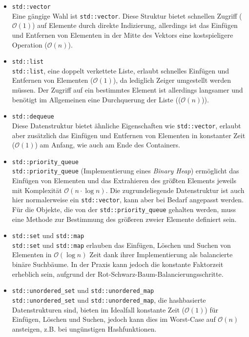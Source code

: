 \begin{itemize}
    \item \texttt{std::vector}\\
    Eine gängige Wahl ist \texttt{std::vector}.
    Diese Struktur bietet schnellen Zugriff ($\mathcal{O}(1)$) auf Elemente durch direkte Indizierung, allerdings ist
    das Einfügen und Entfernen von Elementen in der Mitte des Vektors eine kostspieligere Operation ($\mathcal{O}(n)$).
    \item \texttt{std::list}\\
    \texttt{std::list}, eine doppelt verkettete Liste, erlaubt schnelles Einfügen und Entfernen von Elementen ($\mathcal{O}(1)$),
    da lediglich Zeiger umgestellt werden müssen.
    Der Zugriff auf ein bestimmtes Element ist allerdings langsamer und benötigt im Allgemeinen eine Durchquerung der Liste (($\mathcal{O}(n)$)).
    \item \texttt{std::dequeue}\\
    Diese Datenstruktur bietet ähnliche Eigenschaften wie \texttt{std::vector}, erlaubt aber zusätzlich das Einfügen
    und Entfernen von Elementen in konstanter Zeit ($\mathcal{O}(1)$) am Anfang, wie auch am Ende des Containers.
    \item \texttt{std::priority\_queue}\\
    \texttt{std::priority\_queue} (Implementierung eines \textit{Binary Heap}) ermöglicht das Einfügen von Elementen und das Extrahieren des größten Elements jeweils
    mit Komplexität $\mathcal{O}(n\cdot\log n)$.
    Die zugrundeliegende Datenstruktur ist auch hier normalerweise ein \texttt{std::vector}, kann aber bei Bedarf angepasst werden.
    Für die Objekte, die von der \texttt{std::priority\_queue} gehalten werden, muss eine Methode zur Bestimmung des
    größeren zweier Elemente definiert sein.
    \item \texttt{std::set} und \texttt{std::map}\\
    \texttt{std::set} und \texttt{std::map} erlauben das Einfügen, Löschen und Suchen von Elementen in $\mathcal{O}(\log n)$ Zeit
    dank ihrer Implementierung als balancierte binäre Suchbäume.
    In der Praxis kann jedoch die konstante Faktorzeit erheblich sein, aufgrund der Rot-Schwarz-Baum-Balancierungsschritte.
    \item \texttt{std::unordered\_set} und \texttt{std::unordered\_map}\\
    \texttt{std::unordered\_set} und \texttt{std::unordered\_map}, die hashbasierte Datenstrukturen sind, bieten im
    Idealfall konstante Zeit ($\mathcal{O}(1)$) für Einfügen, Löschen und Suchen, jedoch kann dies im Worst-Case auf $\mathcal{O}(n)$
    ansteigen, z.B. bei ungünstigen Hashfunktionen.
\end{itemize}

